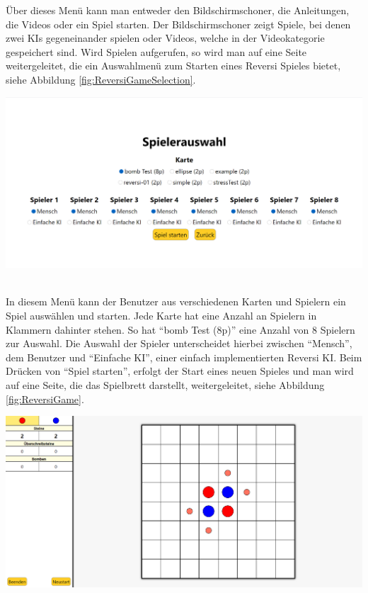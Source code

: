 \documentclass[12pt,a4paper,bibliography=totocnumbered,listof=totocnumbered]{article}
\begin{document}
Über dieses Menü kann man entweder den Bildschirmschoner, die Anleitungen, die Videos oder ein Spiel starten. Der Bildschirmschoner 
zeigt Spiele, bei denen zwei \ac{KI}s gegeneinander spielen oder Videos, welche in der Videokategorie gespeichert sind. Wird Spielen aufgerufen, 
so wird man auf eine Seite weitergeleitet, die ein Auswahlmenü zum Starten eines Reversi Spieles bietet, siehe Abbildung \ref{fig:ReversiGameSelection}.

\vspace{1em}
\begin{minipage}{\linewidth}
	\centering
	\includegraphics[width=0.7\linewidth]{pics/ReversiGameSelection.png}
	\label{fig:ReversiGameSelection}
\end{minipage}
\\

In diesem Menü kann der Benutzer aus verschiedenen Karten und Spielern ein Spiel auswählen und starten. Jede Karte hat eine Anzahl an Spielern 
in Klammern dahinter stehen. So hat ``bomb Test (8p)'' eine Anzahl von 8 Spielern zur Auswahl. Die Auswahl der Spieler unterscheidet hierbei
zwischen ``Mensch'', dem Benutzer und ``Einfache KI'', einer einfach implementierten Reversi \ac{KI}. Beim Drücken von ``Spiel starten'', erfolgt der Start
eines neuen Spieles und man wird auf eine Seite, die das Spielbrett darstellt, weitergeleitet, siehe Abbildung \ref{fig:ReversiGame}.

\vspace{1em}
\begin{minipage}{\linewidth}
	\centering
	\includegraphics[width=0.7\linewidth]{pics/ReversiGame.png}
	\label{fig:ReversiGame}
\end{minipage}
\\
\end{document}
